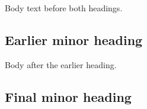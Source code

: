 \documentclass{article}
\begin{document}
\ttfamily
\noindent Body text before both headings.
\subsection*{\normalfont\ttfamily Earlier minor heading}
\noindent Body after the earlier heading.
\vfill
\subsection*{\normalfont\ttfamily Final minor heading}
\end{document}
